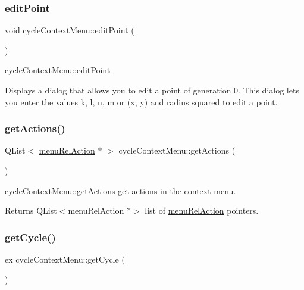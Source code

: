 \subsubsection{\texorpdfstring{edit\+Point}{editPoint}}
{\footnotesize\ttfamily void cycle\+Context\+Menu\+::edit\+Point (\begin{DoxyParamCaption}{ }\end{DoxyParamCaption})\hspace{0.3cm}{\ttfamily [slot]}}



\mbox{\hyperlink{classcycle_context_menu_ae807f1cddefcdedf9f8c60473bd287df}{cycle\+Context\+Menu\+::edit\+Point}} 

Displays a dialog that allows you to edit a point of generation 0. This dialog lets you enter the values k, l, n, m or (x, y) and radius squared to edit a point. \mbox{\label{classcycle_context_menu_a4dd57e4522c46a70367b6b721f23bcc9}} 
\subsubsection{\texorpdfstring{get\+Actions()}{getActions()}}
{\footnotesize\ttfamily Q\+List$<$ \mbox{\hyperlink{classmenu_rel_action}{menu\+Rel\+Action}} $\ast$ $>$ cycle\+Context\+Menu\+::get\+Actions (\begin{DoxyParamCaption}{ }\end{DoxyParamCaption})}



\mbox{\hyperlink{classcycle_context_menu_a4dd57e4522c46a70367b6b721f23bcc9}{cycle\+Context\+Menu\+::get\+Actions}} get actions in the context menu. 

\begin{DoxyReturn}{Returns}
Q\+List$<$menu\+Rel\+Action $\ast$$>$ list of \mbox{\hyperlink{classmenu_rel_action}{menu\+Rel\+Action}} pointers. 
\end{DoxyReturn}
\mbox{\label{classcycle_context_menu_a35b3868cdc32b97e7c4abc109ee13460}} 
\subsubsection{\texorpdfstring{get\+Cycle()}{getCycle()}}
{\footnotesize\ttfamily ex cycle\+Context\+Menu\+::get\+Cycle (\begin{DoxyParamCaption}{ }\end{DoxyParamCaption})}



